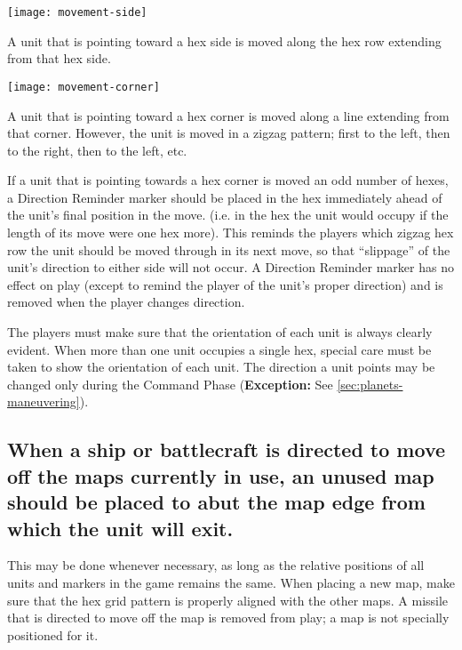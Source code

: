 \begin{center}
  \texttt{[image: movement-side]}
\end{center}


A unit that is pointing toward a hex side is moved along the hex row
extending from that hex side.


\begin{center}
  \texttt{[image: movement-corner]}
\end{center}

A unit that is pointing toward a hex corner is moved along a line
extending from that corner. However, the unit is moved in a zigzag
pattern; first to the left, then to the right, then to the left, etc.

\medskip

If a unit that is pointing towards a hex corner is moved an odd number
of hexes, a Direction Reminder marker should be placed in the hex
immediately ahead of the unit's final position in the move. (i.e. in
the hex the unit would occupy if the length of its move were one hex
more). This reminds the players which zigzag hex row the unit should
be moved through in its next move, so that ``slippage'' of the unit's
direction to either side will not occur. A Direction Reminder marker
has no effect on play (except to remind the player of the unit's
proper direction) and is removed when the player changes direction.

The players must make sure that the orientation of each unit is always
clearly evident. When more than one unit occupies a single hex,
special care must be taken to show the orientation of each unit. The
direction a unit points may be changed only during the Command Phase
(\textbf{Exception:} See \ref{sec:planets-maneuvering}).

\subsection[Map Placement]{When a ship or battlecraft is directed to
  move off the maps currently in use, an unused map should be  
  placed to abut the map edge from which the unit will exit.}
\label{sec:map-placement}

 

This may be done whenever necessary, as long as the relative positions
of all units and markers in the game remains the same. When placing a
new map, make sure that the hex grid pattern is properly aligned with
the other maps. A missile that is directed to move off the map is
removed from play; a map is not specially positioned for it.

